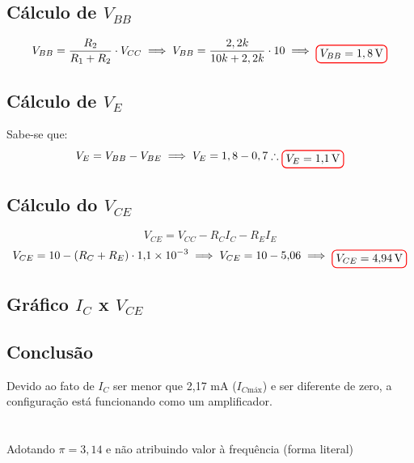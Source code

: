 \documentclass[12pt,openany,oneside,a4paper]{abntex2}
\begin{document}
\subsection{Cálculo de $V_{BB}$}
\[
V_{BB} = \frac{R_{2}}{R_{1} + R_{2}} \cdot V_{CC}
\implies
V_{BB} = \frac{2,2k}{10k + 2,2k} \cdot 10
\implies
\tikz[baseline]{\node[draw=red, thick, rounded corners] {$V_{BB} = 1,8\,\text{V}$};}
\]

\subsection{Cálculo de $V_{E}$}
Sabe-se que:
\[
V_{E} = V_{BB} - V_{BE} \implies V_{E} = 1,8 - 0,7 \therefore \tikz[baseline]{\node[draw=red, thick, rounded corners] {$V_{E} = 1{,}1\,\text{V}$};}
\]

\subsection{Cálculo do $V_{CE}$}
\[
V_{CE} = V_{CC} - R_C I_C - R_E I_E
\]
\[
V_{CE} = 10 - (R_C + R_E) \cdot 1{,}1 \times 10^{-3} \implies V_{CE} = 10 - 5{,}06 \implies \tikz[baseline]{\node[draw=red, thick, rounded corners] {$V_{CE} = 4{,}94 \, \text{V}$};}
\]

\subsection{Gráfico $I_{C}$ x $V_{CE}$}
\begin{center}
\end{center}

\subsection{Conclusão}
Devido ao fato de $I_{C}$ ser menor que 2{,}17 mA ($I_{C\text{máx}}$) e ser diferente de zero, a configuração está funcionando como um amplificador.

\section{}
Adotando $\pi = 3,14$ e não atribuindo valor à frequência (forma literal)
\end{document}
